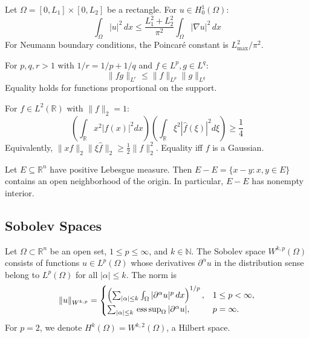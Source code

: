\begin{example}
Let $\Omega = [0,L_1] \times [0,L_2]$ be a rectangle. For $u \in H_0^1(\Omega)$:
\[ \int_\Omega |u|^2 \,dx \leq \frac{L_1^2 + L_2^2}{\pi^2} \int_\Omega |\nabla u|^2 \,dx \]
For Neumann boundary conditions, the Poincaré constant is $L_{\max}^2/\pi^2$.
\end{example}

\begin{example}
For $p,q,r > 1$ with $1/r = 1/p + 1/q$ and $f \in L^p, g \in L^q$:
\[ \|fg\|_{L^r} \leq \|f\|_{L^p} \|g\|_{L^q} \]
Equality holds for functions proportional on the support.
\end{example}

\begin{example}
For $f \in L^2(\mathbb{R})$ with $\|f\|_2 = 1$:
\[ \left(\int_{\mathbb{R}} x^2 |f(x)|^2 dx\right) \left(\int_{\mathbb{R}} \xi^2 |\hat{f}(\xi)|^2 d\xi\right) \geq \frac{1}{4} \]
Equivalently, $\|xf\|_2 \|\xi \hat{f}\|_2 \geq \frac{1}{2}\|f\|_2^2$. Equality iff $f$ is a Gaussian.
\end{example}

\begin{example}
Let $E \subseteq \mathbb{R}^n$ have positive Lebesgue measure. Then $E - E = \{x-y : x,y \in E\}$ contains an open neighborhood of the origin. In particular, $E - E$ has nonempty interior.
\end{example}

\subsection{Sobolev Spaces}

\begin{definition}
Let $\Omega \subset \mathbb{R}^n$ be an open set, $1 \leq p \leq \infty$, and $k \in \mathbb{N}$.
The Sobolev space $W^{k,p}(\Omega)$ consists of functions $u \in L^p(\Omega)$ whose derivatives
$\partial^\alpha u$ in the distribution sense belong to $L^p(\Omega)$ for all $|\alpha| \leq k$.
The norm is
\[
\|u\|_{W^{k,p}} = \begin{cases}
\left( \sum_{|\alpha| \leq k} \int_\Omega |\partial^\alpha u|^p \, dx \right)^{1/p}, & 1 \leq p < \infty, \\
\sum_{|\alpha| \leq k} \,\mathop\mathrm{ess\,sup}_\Omega |\partial^\alpha u|, & p = \infty.
\end{cases}
\]
For $p=2$, we denote $H^k(\Omega) = W^{k,2}(\Omega)$, a Hilbert space.
\end{definition}

